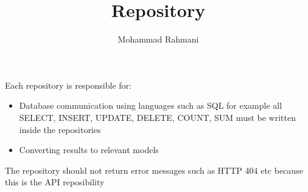 \documentclass[a4paper]{article}
\title{Repository}
\date{}
\author{Mohammad Rahmani}
\begin{document}
    \maketitle
    Each repository is responsible for:
    \begin{itemize}
        \item Database communication using languages such as SQL for example all SELECT, INSERT, UPDATE, DELETE, COUNT, SUM must be written inside the repositories
        \item Converting results to relevant models
    \end{itemize}
    The repository should not return error messages such as HTTP 404 etc because this is the API reposibility
    
    
\end{document}
